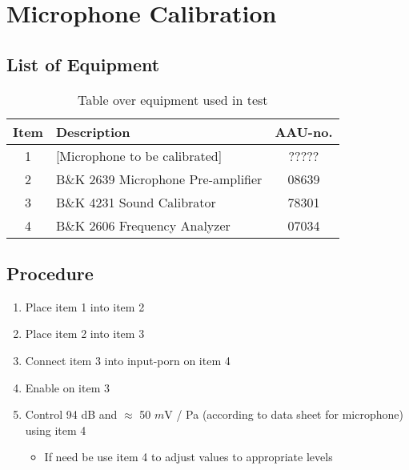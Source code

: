 \section{Microphone Calibration}

\subsection{List of Equipment}
\begin{table}[h]
	\centering
	\begin{tabular}{ c l c } \toprule
		{Item} &	{Description} & {AAU-no}. \\ \bottomrule 
		1	&	[Microphone to be calibrated]			& ?????			\\
		2	&	B\&K 2639 Microphone Pre-amplifier		& 08639			\\  
		3	&	B\&K 4231 Sound Calibrator				& 78301			\\
		4	&	B\&K 2606 Frequency Analyzer			& 07034			\\ \bottomrule 
	\end{tabular}
	\caption{Table over equipment used in test}
	\label{tab:UsedEquipmentListning}
\end{table}

\subsection{Procedure}
\begin{enumerate}
	\item Place item 1 into item 2
	\item Place item 2 into item 3
	\item Connect item 3 into input-porn on item 4
	\item Enable on item 3
	\item Control 94 dB and $\approx$ 50 $m$V / Pa (according to data sheet for microphone) using item 4
	\begin{itemize}
		\item If need be use item 4 to adjust values to appropriate levels
	\end{itemize}
\end{enumerate}
